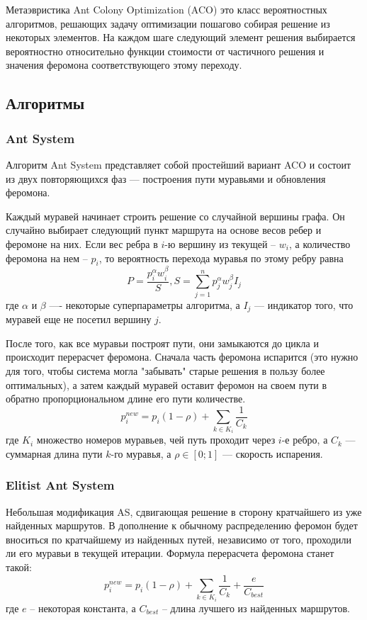 \documentclass{article}
\begin{document}
Метаэвристика Ant Colony Optimization (ACO) это класс вероятностных алгоритмов, решающих задачу оптимизации пошагово собирая решение из некоторых элементов. На каждом шаге следующий элемент решения выбирается вероятностно относительно функции стоимости от частичного решения и значения феромона соответствующего этому переходу.

\subsection{Алгоритмы}
\subsubsection{Ant System}
Алгоритм Ant System представляет собой простейший вариант ACO и состоит из двух повторяющихся фаз --- построения пути муравьями и обновления феромона.

Каждый муравей начинает строить решение со случайной вершины графа. Он случайно выбирает следующий пункт маршрута на основе весов ребер и феромоне на них. Если вес ребра в $i$-ю вершину из текущей -- $w_{i}$, а количество феромона на нем -- $p_{i}$, то вероятность перехода муравья по этому ребру равна 
\[ P=\frac{p_i^\alpha w_i^\beta}{S}, S=\sum_{j=1}^{n} p_j^\alpha w_j^\beta I_j \]
где $\alpha$ и $\beta$ ---- некоторые суперпараметры алгоритма, а $I_j$ --- индикатор того, что муравей еще не посетил вершину $j$.

После того, как все муравьи построят пути, они замыкаются до цикла и происходит перерасчет феромона. Сначала часть феромона испарится (это нужно для того, чтобы система могла "забывать" старые решения в пользу более оптимальных), а затем каждый муравей оставит феромон на своем пути в обратно пропорциональном длине его пути количестве.
\[p_i^{new}=p_i(1-\rho)+\sum_{k\in K_i}\frac1{C_k}\]
где $K_i$ множество номеров муравьев, чей путь проходит через $i$-е ребро, а $C_k$ --- суммарная длина пути $k$-го муравья, а $\rho\in[0;1]$ --- скорость испарения.

\subsubsection{Elitist Ant System}
Небольшая модификация AS, сдвигающая решение в сторону кратчайшего из уже найденных маршрутов. В дополнение к обычному распределению феромон будет вноситься по кратчайшему из найденных путей, независимо от того, проходили ли его муравьи в текущей итерации. Формула перерасчета феромона станет такой:
\[p_i^{new}=p_i(1-\rho)+\sum_{k\in K_i}\frac1{C_k}+\frac e {C_{best}}\]
где $e$ -- некоторая константа, а $C_{best}$ -- длина лучшего из найденных маршрутов.
\end{document}
